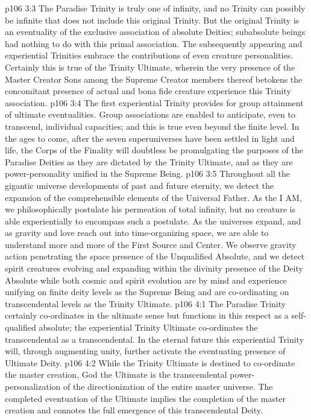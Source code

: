 \vs p106 3:3 The Paradise Trinity is truly one of infinity, and no Trinity can possibly be infinite that does not include this original Trinity. But the original Trinity is an eventuality of the exclusive association of absolute Deities; subabsolute beings had nothing to do with this primal association. The subsequently appearing and experiential Trinities embrace the contributions of even creature personalities. Certainly this is true of the Trinity Ultimate, wherein the very presence of the Master Creator Sons among the Supreme Creator members thereof betokens the concomitant presence of actual and bona fide creature experience  this Trinity association.
\vs p106 3:4 The first experiential Trinity provides for group attainment of ultimate eventualities. Group associations are enabled to anticipate, even to transcend, individual capacities; and this is true even beyond the finite level. In the ages to come, after the seven superuniverses have been settled in light and life, the Corps of the Finality will doubtless be promulgating the purposes of the Paradise Deities as they are dictated by the Trinity Ultimate, and as they are power\hyp{}personality unified in the Supreme Being.
\vs p106 3:5 \pc Throughout all the gigantic universe developments of past and future eternity, we detect the expansion of the comprehensible elements of the Universal Father. As the I AM, we philosophically postulate his permeation of total infinity, but no creature is able experientially to encompass such a postulate. As the universes expand, and as gravity and love reach out into time\hyp{}organizing space, we are able to understand more and more of the First Source and Center. We observe gravity action penetrating the space presence of the Unqualified Absolute, and we detect spirit creatures evolving and expanding within the divinity presence of the Deity Absolute while both cosmic and spirit evolution are by mind and experience unifying on finite deity levels as the Supreme Being and are co\hyp{}ordinating on transcendental levels as the Trinity Ultimate.
\vs p106 4:1 The Paradise Trinity certainly co\hyp{}ordinates in the ultimate sense but functions in this respect as a self\hyp{}qualified absolute; the experiential Trinity Ultimate co\hyp{}ordinates the transcendental as a transcendental. In the eternal future this experiential Trinity will, through augmenting unity, further activate the eventuating presence of Ultimate Deity.
\vs p106 4:2 While the Trinity Ultimate is destined to co\hyp{}ordinate the master creation, God the Ultimate is the transcendental power\hyp{}personalization of the directionization of the entire master universe. The completed eventuation of the Ultimate implies the completion of the master creation and connotes the full emergence of this transcendental Deity.

